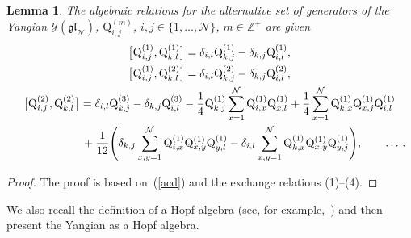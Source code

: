 \documentclass[pdftex]{sigma}
\numberwithin{equation}{section}
\newtheorem{lem}[thm]{Lemma}
\theoremstyle{definition}
\begin{document}
\begin{lem}\label{lemmaq}
The algebraic relations for the alternative set of generators of the Yangian ${\mathcal Y}(\mathfrak{gl}_{\mathcal N})$,
${\mathrm Q}_{i,j}^{(m)}$, $i,j \in \{1, \dots, {\mathcal N} \}$, $m \in {\mathbb Z}^+$ are given
\begin{gather*}
\bigl[ {\mathrm Q}_{i,j}^{(1)}, {\mathrm Q}_{k,l}^{(1)} \bigr] =\delta_{i,l}{\mathrm Q}^{(1)}_{k,j}- \delta_{k,j}{\mathrm Q}^{(1)}_{i,l},\\
 \bigl[ {\mathrm Q}_{i,j}^{(1)}, {\mathrm Q}_{k,l}^{(2)} \bigr] =\delta_{i,l}{\mathrm Q}^{(2)}_{k,j}-\delta_{k,j}
{\mathrm Q}^{(2)}_{i,l},\\
\bigl[ {\mathrm Q}_{i,j}^{(2)}, {\mathrm Q}_{k,l}^{(2)} \bigr]
= \delta_{i,l}{\mathrm Q}^{(3)}_{k,j}- \delta_{k,j}{\mathrm Q}^{(3)}_{i,l}
-\frac{1}{4}{\mathrm Q}_{k,j}^{(1)}\sum_{x=1}^{\mathcal N} {\mathrm
Q}_{i,x}^{(1)}{\mathrm Q}_{x,l}^{(1)}+ \frac{1}{4}\sum_{x=1}^{\mathcal N}{\mathrm Q}_{k,x}^{(1)}{\mathrm Q}_{x,j}^{(1)}
{\mathrm Q}_{i,l}^{(1)}
\\
\hphantom{\bigl[ {\mathrm Q}_{i,j}^{(2)}, {\mathrm Q}_{k,l}^{(2)} \bigr]=}{}
 + \frac{1}{12} \Biggl( \delta_{k,j} \sum_{x,y=1}^{\mathcal N}{\mathrm Q}_{i,x}^{(1)}{\mathrm Q}_{x,y}^{(1)}
{\mathrm Q}_{y,l}^{(1)} - \delta_{i,l} \sum_{x,y=1}^{\mathcal N}{\mathrm Q}_{k,x}^{(1)} {\mathrm Q}_{x,y}^{(1)}
{\mathrm Q}_{y,j}^{(1)}\Biggr), \qquad \dots\,. %
\end{gather*}
\end{lem}
\begin{proof}
The proof is based on~(\ref{acd}) and the exchange relations (1)--(4).
\end{proof}

We also recall the definition of a Hopf algebra (see, for example,~\cite{Chari, Majid}) and then present the Yangian as a Hopf algebra.
\end{document}
